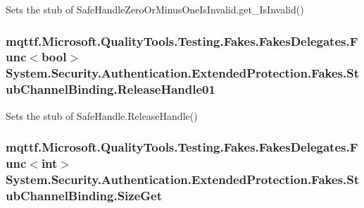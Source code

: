 Sets the stub of Safe\-Handle\-Zero\-Or\-Minus\-One\-Is\-Invalid.\-get\-\_\-\-Is\-Invalid()

\hypertarget{class_system_1_1_security_1_1_authentication_1_1_extended_protection_1_1_fakes_1_1_stub_channel_binding_af54cb91ce589053eff871faa7a4b7e72}{
\subsubsection[{Release\-Handle01}]{\setlength{\rightskip}{0pt plus 5cm}mqttf.\-Microsoft.\-Quality\-Tools.\-Testing.\-Fakes.\-Fakes\-Delegates.\-Func$<$bool$>$ System.\-Security.\-Authentication.\-Extended\-Protection.\-Fakes.\-Stub\-Channel\-Binding.\-Release\-Handle01}}\label{class_system_1_1_security_1_1_authentication_1_1_extended_protection_1_1_fakes_1_1_stub_channel_binding_af54cb91ce589053eff871faa7a4b7e72}


Sets the stub of Safe\-Handle.\-Release\-Handle()

\hypertarget{class_system_1_1_security_1_1_authentication_1_1_extended_protection_1_1_fakes_1_1_stub_channel_binding_a65a39f1dd1d8a1fd4589912cdef60bde}{
\subsubsection[{Size\-Get}]{\setlength{\rightskip}{0pt plus 5cm}mqttf.\-Microsoft.\-Quality\-Tools.\-Testing.\-Fakes.\-Fakes\-Delegates.\-Func$<$int$>$ System.\-Security.\-Authentication.\-Extended\-Protection.\-Fakes.\-Stub\-Channel\-Binding.\-Size\-Get}}\label{class_system_1_1_security_1_1_authentication_1_1_extended_protection_1_1_fakes_1_1_stub_channel_binding_a65a39f1dd1d8a1fd4589912cdef60bde}



